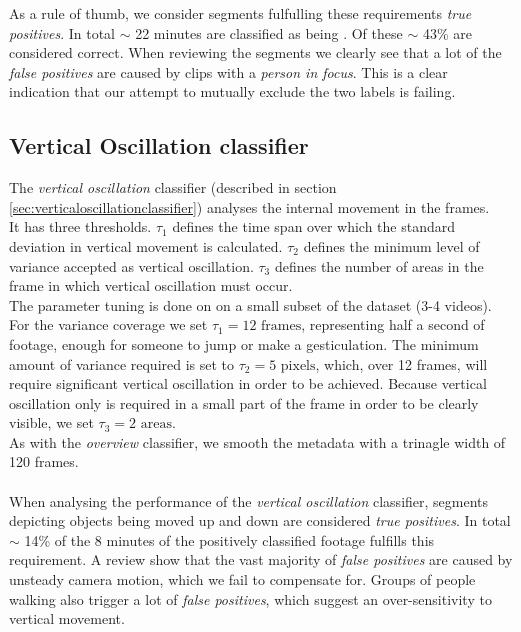 %
As a rule of thumb, we consider segments fulfulling these requirements \textit{true positives}. In total $\sim$ 22 minutes are classified as being . Of these $\sim$ 43\% are considered correct. When reviewing the segments we clearly see that a lot of the \textit{false positives} are caused by clips with a \textit{person in focus}. This is a clear indication that our attempt to mutually exclude the two labels is failing.
%
\subsection{Vertical Oscillation classifier}
%
The \textit{vertical oscillation} classifier (described in section \ref{sec:verticaloscillationclassifier}) analyses the internal movement in the frames.\\
It has three thresholds. $\tau_1$ defines the time span over which the standard deviation in vertical movement is calculated. $\tau_2$ defines the minimum level of variance accepted as vertical oscillation. $\tau_3$ defines the number of areas in the frame in which vertical oscillation must occur.\\
The parameter tuning is done on on a small subset of the dataset (3-4 videos). For the variance coverage we set $\tau_1 = 12 \text{ frames}$, representing half a second of footage, enough for someone to jump or make a gesticulation. The minimum amount of variance required is set to $\tau_2 = 5 \text{ pixels}$, which, over 12 frames, will require significant vertical oscillation in order to be achieved. Because vertical oscillation only is required in a small part of the frame in order to be clearly visible, we set $\tau_3 = 2 \text{ areas}$.\\
As with the \textit{overview} classifier, we smooth the metadata with a trinagle width of 120 frames.\\
\\
When analysing the performance of the \textit{vertical oscillation} classifier, segments depicting objects being moved up and down are considered \textit{true positives}. In total $\sim$ 14\% of the 8 minutes of the positively classified footage fulfills this requirement. A review show that the vast majority of \textit{false positives} are caused by unsteady camera motion, which we fail to compensate for. Groups of people walking also trigger a lot of \textit{false positives}, which suggest an over-sensitivity to vertical movement.
%
%
